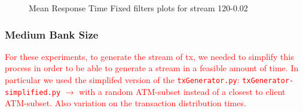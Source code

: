 \documentclass[12pt,a4paper]{article}
\begin{document}
\begin{figure}[H]
    \centering
    
    \vspace{0.5cm} %


    \caption{Mean Response Time Fixed filters plots for stream 120-0.02}
    \label{img:exps-read-input-variants}
\end{figure}

\subsubsection{Medium Bank Size}
  
\textcolor{red}{For these experiments, to generate the stream of tx, we needed to simplify this process in order to be able to generate a stream in a feasible amount of time. In particular we used the simplifed version of the \texttt{txGenerator.py}: \texttt{txGenerator-simplified.py} $\rightarrow$ with a random ATM-subset instead of a closest to client ATM-subset. Also variation on the transaction distribution times.}
  
\end{document}
